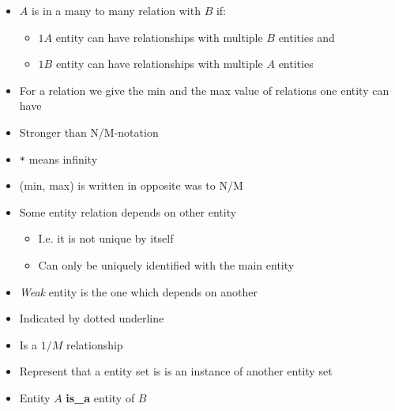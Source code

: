 \begin{itemize}
\begin{itemize}
\begin{itemize}
\begin{itemize}
                            \item $A$ is in a many to many relation with $B$ if:
                                \begin{itemize}
                                    \item $1 A$ entity can have relationships with multiple $B$ entities and
                                    \item $1 B$ entity can have relationships with multiple $A$ entities
                                \end{itemize}
                        \end{itemize}
                \end{itemize}
                \begin{itemize}
                    \item For a relation we give the min and the max value of relations one entity can have
                    \item Stronger than N/M-notation
                    \item \verb+*+ means infinity
                    \item (min, max) is written in opposite was to N/M
                \end{itemize}
        \end{itemize}
        \begin{itemize}
            \item Some entity relation depends on other entity
                \begin{itemize}
                    \item I.e. it is not unique by itself
                    \item Can only be uniquely identified with the main entity
                \end{itemize}
            \item \textit{Weak} entity is the one which depends on another
            \item Indicated by dotted underline
            \item Is a $1/M$ relationship
        \end{itemize}
        \begin{itemize}
            \item Represent that a entity set is is an instance of another entity set
            \item Entity $A$ \textbf{is\_a} entity of $B$

\end{itemize}
\end{itemize}
